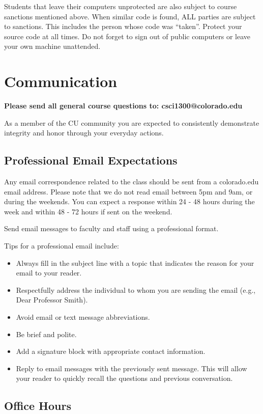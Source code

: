 Students that leave their computers unprotected are also subject to course sanctions mentioned above. When similar code is found, ALL parties are subject to sanctions. This includes the person whose code was “taken”. Protect your source code at all times. Do not forget to sign out of public computers or leave your own machine unattended.

\section{Communication}

\textbf{Please send all general course questions to: csci1300@colorado.edu}

As a member of the CU community you are expected to consistently demonstrate integrity and honor through your everyday actions.

\subsection{Professional Email Expectations}

Any email correspondence related to the class should be sent from a colorado.edu email address. Please note that we do not read email between 5pm and 9am, or during the weekends. You can expect a response within 24 - 48 hours during the week and within 48 - 72 hours if sent on the weekend.

Send email messages to faculty and staff using a professional format.

Tips for a professional email include:

\begin{itemize}
    \item Always fill in the subject line with a topic that indicates the reason for your email to your reader.
    \item Respectfully address the individual to whom you are sending the email (e.g., Dear Professor Smith).
    \item Avoid email or text message abbreviations.
    \item Be brief and polite.
    \item Add a signature block with appropriate contact information.
    \item Reply to email messages with the previously sent message. This will allow your reader to quickly recall the questions and previous conversation.
\end{itemize}
    

\subsection{Office Hours}

